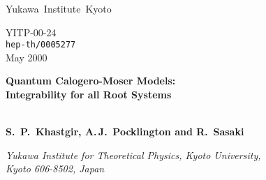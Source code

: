\documentclass[a4paper,12pt]{article}
\begin{document}
%
\renewcommand{\theequation}{\arabic{section}.\arabic{equation}}
\providecommand{\tabtopsp}[1]{\vbox{\vbox to#1{}\vbox to12pt{}}}

\providecommand{\preprint}{
            \begin{flushleft}
   \elevenmib Yukawa\, Institute\, Kyoto\\
            \end{flushleft}\vspace{-1.3cm}
            \begin{flushright}\normalsize  \sf
            YITP-00-24\\
           {\tt hep-th/0005277} \\ May 2000
            \end{flushright}}
\providecommand{\Title}[1]{{\baselineskip=26pt \begin{center}
            \Large   \bf #1 \\ \ \\ \end{center}}}
\providecommand{\Author}{\begin{center}\large \bf
            S.\, P.\, Khastgir, A.\,J.\, Pocklington and R.\, Sasaki
     \end{center}}
\hspace*{0.7cm}%
\providecommand{\Address}{\begin{center} \it
            Yukawa Institute for Theoretical Physics, Kyoto
            University,\\ Kyoto 606-8502, Japan
      \end{center}}
\providecommand{\Accepted}[1]{\begin{center}{\large \sf #1}\\
            \vspace{1mm}{\small \sf Accepted for Publication}
            \end{center}}
\baselineskip=20pt

\preprint
\thispagestyle{empty}
\bigskip
\bigskip

\Title{Quantum Calogero-Moser Models: \\ Integrability for all Root Systems}
\Author

\Address
\vspace{1.5cm}
\end{document}
